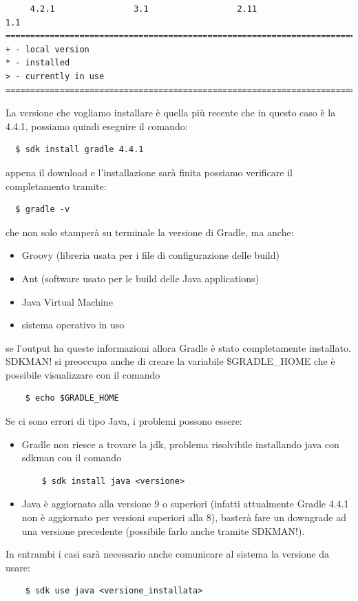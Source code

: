 \documentclass{article}
\begin{document}
\begin{flushleft}
\begin{verbatim}
     4.2.1                3.1                  2.11                 1.1            
================================================================================
+ - local version
* - installed
> - currently in use
================================================================================ \end{verbatim}
La versione che vogliamo installare è quella più recente che in questo caso è la 4.4.1, possiamo quindi eseguire il comando:
\begin{verbatim}
  $ sdk install gradle 4.4.1 \end{verbatim}
appena il download e l'installazione sarà finita possiamo verificare il completamento tramite:
\begin{verbatim}
  $ gradle -v \end{verbatim}
che non solo stamperà su terminale la versione di Gradle, ma anche:
\begin{itemize}
  \item Groovy (libreria usata per i file di configurazione delle build)
  \item Ant (software usato per le build delle Java applications)
  \item Java Virtual Machine
  \item sistema operativo in uso
\end{itemize}
se l'output ha queste informazioni allora Gradle è stato completamente installato. SDKMAN! si preoccupa anche di creare la variabile \$GRADLE\_HOME che è possibile visualizzare con il comando 
\begin{verbatim} 
    $ echo $GRADLE_HOME \end{verbatim} 
Se ci sono errori di tipo Java, i problemi possono essere:
\begin{itemize}
  \item Gradle non riesce a trovare la jdk, problema risolvibile installando java con sdkman con il comando 
  \begin{verbatim}
    $ sdk install java <versione>  \end{verbatim}
  \item Java è aggiornato alla versione 9 o superiori (infatti attualmente Gradle 4.4.1 non è aggiornato per versioni superiori alla 8), basterà fare un downgrade ad una versione precedente (possibile farlo anche tramite SDKMAN!).
\end{itemize}
In entrambi i casi sarà necessario anche comunicare al sistema la versione da usare: 
\begin{verbatim}  
    $ sdk use java <versione_installata> \end{verbatim} 

\end{flushleft}
\end{document}
